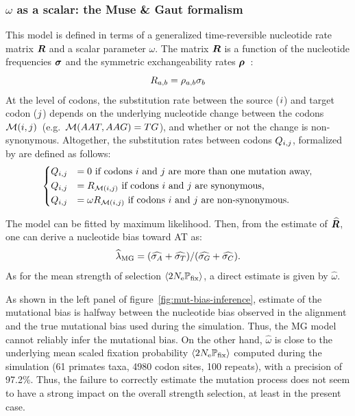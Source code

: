 \documentclass{article}
\begin{document}
\subsubsection{\texorpdfstring{$\omega$}{ω} as a scalar: the Muse \& Gaut formalism}
This model is defined in terms of a generalized time-reversible nucleotide rate matrix $\bm{R}$ and a scalar parameter $\omega$.
The matrix $\bm{R}$ is a function of the nucleotide frequencies $\bm{\sigma}$ and the symmetric exchangeability rates $\bm{\rho}$~\citep{Tavare1986}:
\begin{equation}
 R_{a, b} = \rho_{a,b}\sigma_b
\end{equation}
At the level of codons, the {substitution} rate between the source (${i}$) and target codon (${j}$) depends on the underlying nucleotide change between the codons $\mathcal{M}({i}, {j})$~(e.g.~$\mathcal{M}(AAT, AAG) = TG$), and whether or not the change is {non-synonymous}.
Altogether, the {substitution} rates between codons $Q_{{i}, {j}}$, formalized by \citet{Muse1994} are defined as follows:
\begin{equation}
 \begin{dcases}
 Q_{{i}, {j}} & = 0 \text{ if codons ${i}$ and ${j}$ are more than one mutation away,} \\
 Q_{{i}, {j}} & = R_{\mathcal{M}({i}, {j})} \text{ if codons ${i}$ and ${j}$ are {synonymous},} \\
 Q_{{i}, {j}} & = \omega R_{\mathcal{M}({i}, {j})} \text{ if codons ${i}$ and ${j}$ are non-synonymous}.
 \end{dcases}
 \label{eq:codon-muse-gaut}
\end{equation}

The model can be fitted by maximum {likelihood}.
Then, from the estimate of $\widehat{\bm{R}}$, one can derive a nucleotide bias toward AT as:
\begin{equation}
 \widehat{\lambda}_{\text{{MG}}} = (\widehat{\sigma_A} +\widehat{\sigma_T}) /(\widehat{\sigma_G} +\widehat{\sigma_C}).\label{eq:lambda-R}
\end{equation}
As for the mean strength of selection $\left\langle 2 N_{\text{e}} \mathbb{P}_{\text{fix}} \right\rangle$, a direct estimate is given by $\widehat{\omega}$.

As shown in the left panel of figure~\ref{fig:mut-bias-inference}, estimate of the mutational bias is halfway between the nucleotide bias observed in the alignment and the true mutational bias used during the simulation.
Thus, the {MG} model cannot reliably infer the mutational bias.
On the other hand, $\widehat{\omega}$ is close to the underlying mean scaled fixation probability $\left\langle 2 N_{\text{e}} \mathbb{P}_{\text{fix}} \right\rangle$ computed during the simulation (61 primates taxa, 4980 codon sites, 100 repeats), with a precision of 97.2\%.
Thus, the failure to correctly estimate the mutation process does not seem to have a strong impact on the overall strength selection, at least in the present case.
\end{document}
